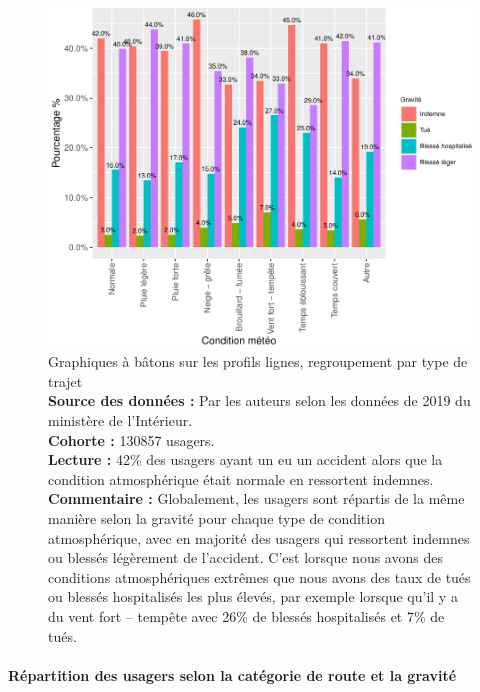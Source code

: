 \documentclass[french,]{tp}
\let\oldparagraph\paragraph
\renewcommand{\paragraph}[1]{\oldparagraph{#1}\mbox{}}
\begin{document}
\begin{figure}[ht!]

{\centering \includegraphics{Prediction_Gravite_files/figure-latex/barplotatm-1} 

}

\caption{Graphiques à bâtons sur les profils lignes, regroupement par type de trajet\\
\textbf{Source des données :} Par les auteurs selon les données de 2019 du ministère de l'Intérieur.\\
\textbf{Cohorte :} 130857 usagers.\\
\textbf{Lecture :} 42\% des usagers ayant un eu un accident alors que la condition atmosphérique était normale en ressortent indemnes.\\
\textbf{Commentaire :} Globalement, les usagers sont répartis de la même manière selon la gravité pour chaque type de condition atmosphérique, avec en majorité des usagers qui ressortent indemnes ou blessés légèrement de l'accident. C'est lorsque nous avons des conditions atmosphériques extrêmes que nous avons des taux de tués ou blessés hospitalisés les plus élevés, par exemple lorsque qu'il y a du vent fort -- tempête avec 26\% de blessés hospitalisés et 7\% de tués.}\label{fig:barplotatm}
\end{figure}

\newpage

\hypertarget{ruxe9partition-des-usagers-selon-la-catuxe9gorie-de-route-et-la-gravituxe9}{%
\paragraph{Répartition des usagers selon la catégorie de route et la gravité}\label{ruxe9partition-des-usagers-selon-la-catuxe9gorie-de-route-et-la-gravituxe9}}
\end{document}

